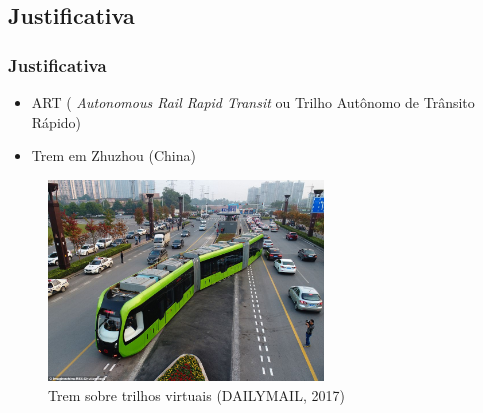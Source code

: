 \subsection{Justificativa}



\begin{frame}
\frametitle{Justificativa}

\begin{itemize}
\item ART (\textit{ Autonomous Rail Rapid Transit} ou Trilho Autônomo de Trânsito Rápido)
\item Trem em Zhuzhou (China)
\end{itemize}

\begin{figure}[]
 \centering
 \captionsetup{width=0.65\textwidth,font=footnotesize,textfont=bf}
 \includegraphics[width=0.65\textwidth,keepaspectratio]{Figuras/Trem.jpg}
 \caption{Trem sobre trilhos virtuais (DAILYMAIL, 2017)}
\end{figure}


\end{frame}


